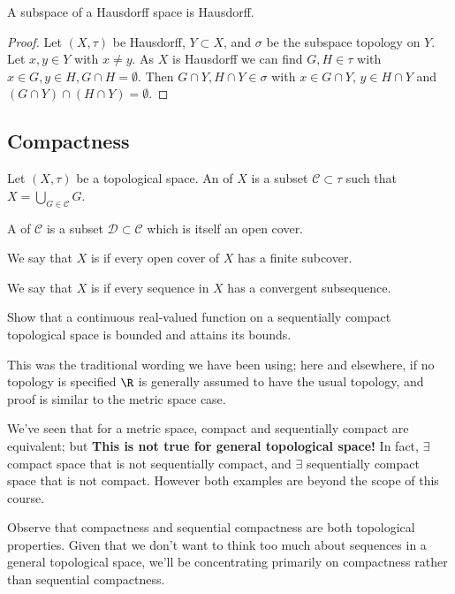 \begin{proposition} \label{prp:32}
A subspace of a Hausdorff space is Hausdorff.
\end{proposition}

\begin{proof}
Let $(X,\tau)$ be Hausdorff, $Y\subset X$, and $\sigma$ be the subspace topology on $Y$. Let $x,y\in Y$ with $x\neq y$. As $X$ is Hausdorff we can find $G,H\in \tau$ with $x\in G, y\in H, G\cap H = \emptyset$. Then $G\cap Y, H\cap Y \in \sigma$ with $x\in G\cap Y$, $y\in H\cap Y$ and $(G\cap Y)\cap (H\cap Y) = \emptyset$.
\end{proof}

\subsection{Compactness}
\begin{definition}
    Let $(X,\tau)$ be a topological space. An  of $X$ is a subset $\mathcal{C}\subset \tau$ such that $X = \bigcup_{G\in\mathcal{C}} G$.
\end{definition}

\begin{definition}[Subcover]
    A  of $\mathcal{C}$ is a subset $\mathcal{D}\subset \mathcal{C}$ which is itself an open cover.
\end{definition}

\begin{definition}[Compactness]
    We say that $X$ is  if every open cover of $X$ has a finite subcover.
\end{definition}

\begin{definition}
    We say that $X$ is  if every sequence in $X$ has a convergent subsequence.
\end{definition}

\begin{exercise}
Show that a continuous real-valued function on a sequentially compact topological space is bounded and attains its bounds.
\end{exercise}

\begin{remark}
This was the traditional wording we have been using; here and elsewhere, if no topology is specified $\R$ is generally assumed to have the usual topology, and proof is similar to the metric space case.

We've seen that for a metric space, compact and sequentially compact are equivalent; but \textbf{\color{red} This is not true for general topological space!} In fact, $\exists$ compact space that is not sequentially compact, and $\exists$ sequentially compact space that is not compact. However both examples are beyond the scope of this course.

Observe that compactness and sequential compactness are both topological properties. Given that we don't want to think too much about sequences in a general topological space, we'll be concentrating primarily on compactness rather than sequential compactness.
\end{remark}

